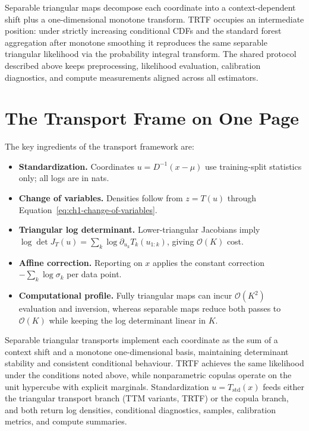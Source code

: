 \documentclass[11pt,a4paper,twoside]{book}\usepackage[]{graphicx}\usepackage[]{xcolor}
\begin{document}
Separable triangular maps decompose each coordinate into a context-dependent shift plus a one-dimensional monotone transform. TRTF occupies an intermediate position: under strictly increasing conditional CDFs and the standard forest aggregation after monotone smoothing it reproduces the same separable triangular likelihood via the probability integral transform. The shared protocol described above keeps preprocessing, likelihood evaluation, calibration diagnostics, and compute measurements aligned across all estimators.

\section{The Transport Frame on One Page}\label{sec:ch1-frame}

The key ingredients of the transport framework are:
\begin{itemize}
  \item \textbf{Standardization.} Coordinates $u = D^{-1}(x-\mu)$ use training-split statistics only; all logs are in nats.
  \item \textbf{Change of variables.} Densities follow from $z = T(u)$ through Equation~\eqref{eq:ch1-change-of-variables}.
  \item \textbf{Triangular log determinant.} Lower-triangular Jacobians imply $\log \det J_T(u) = \sum_k \log \partial_{u_k} T_k(u_{1:k})$, giving $\mathcal{O}(K)$ cost.
  \item \textbf{Affine correction.} Reporting on $x$ applies the constant correction $-\sum_k \log \sigma_k$ per data point.
  \item \textbf{Computational profile.} Fully triangular maps can incur $\mathcal{O}(K^2)$ evaluation and inversion, whereas separable maps reduce both passes to $\mathcal{O}(K)$ while keeping the log determinant linear in $K$.
\end{itemize}

Separable triangular transports implement each coordinate as the sum of a context shift and a monotone one-dimensional basis, maintaining determinant stability and consistent conditional behaviour. TRTF achieves the same likelihood under the conditions noted above, while nonparametric copulas operate on the unit hypercube with explicit marginals. Standardization $u = T_{\mathrm{std}}(x)$ feeds either the triangular transport branch (TTM variants, TRTF) or the copula branch, and both return log densities, conditional diagnostics, samples, calibration metrics, and compute summaries.
\end{document}
